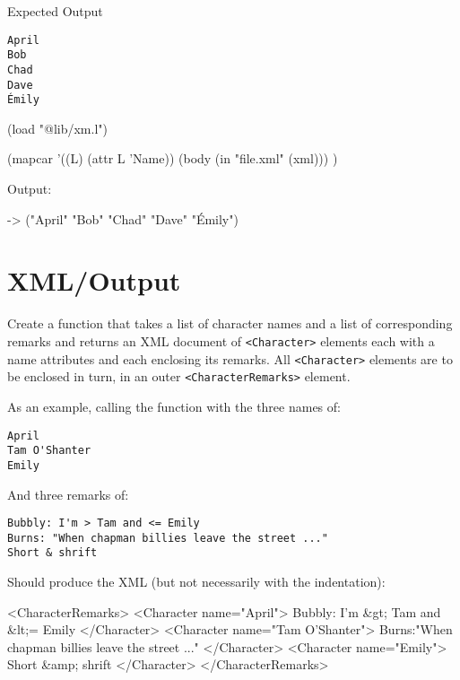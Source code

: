Expected Output

\begin{verbatim}
April
Bob
Chad
Dave
Émily
\end{verbatim}


\begin{wideverbatim}

(load "@lib/xm.l")

(mapcar
   '((L) (attr L 'Name))
   (body (in "file.xml" (xml))) )

Output:

-> ("April" "Bob" "Chad" "Dave" "Émily")

\end{wideverbatim}

\pagebreak{}
\section*{XML/Output}

Create a function that takes a list of character names and a list of
corresponding remarks and returns an XML document of
\texttt{\textless{}Character\textgreater{}} elements each with a name
attributes and each enclosing its remarks. All
\texttt{\textless{}Character\textgreater{}} elements are to be enclosed
in turn, in an outer \texttt{\textless{}CharacterRemarks\textgreater{}}
element.

As an example, calling the function with the three names of:

\begin{verbatim}
April
Tam O'Shanter
Emily
\end{verbatim}

And three remarks of:

\begin{verbatim}
Bubbly: I'm > Tam and <= Emily
Burns: "When chapman billies leave the street ..."
Short & shrift
\end{verbatim}

Should produce the XML (but not necessarily with the indentation):

\begin{wideverbatim}

<CharacterRemarks>
    <Character name="April">
      Bubbly: I'm &gt; Tam and &lt;= Emily
    </Character>
    <Character name="Tam O'Shanter">
      Burns:"When chapman billies leave the street ..."
    </Character>
    <Character name="Emily">
      Short &amp; shrift
    </Character>
</CharacterRemarks>

\end{wideverbatim}

